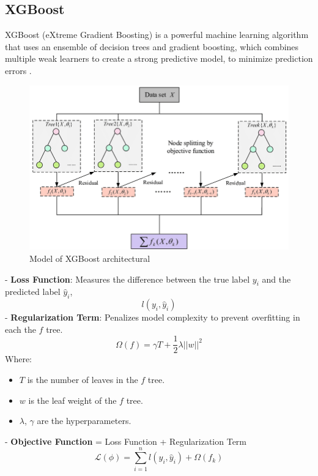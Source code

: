 \documentclass{ieeeojies}
\begin{document}
\subsection{XGBoost}
XGBoost (eXtreme Gradient Boosting) is a powerful machine learning algorithm that uses an ensemble of decision trees and gradient boosting, which combines multiple weak learners to create a strong predictive model, to minimize prediction errors \cite{b9}.\\
\begin{figure} [H]
    \centering
    \includegraphics[width=0.8\linewidth]{./image/XGBoost.png}
    \caption{Model of XGBoost architectural}
    \label{fig:10}
\end{figure}
\noindent
- \textbf{Loss Function}: Measures the difference between the true label \(y_i\) and the predicted label \(\hat{y}_i\),\\
\begin{dmath*}
    l(y_i, \hat{y}_i) 
\end{dmath*}
- \textbf{Regularization Term}: Penalizes model complexity to prevent overfitting in each the \(f\) tree.\\
\begin{dmath*}
    \Omega(f) = \gamma T + \frac{1}{2} \lambda ||w||^2
\end{dmath*}
Where:
\begin{itemize}
    \item \(T\) is the number of leaves in the \(f\) tree.
    \item \(w\) is the leaf weight of the \(f\) tree.
    \item \(\lambda\), \(\gamma\)  are the  hyperparameters.
\end{itemize}
- \textbf{Objective Function} = Loss Function + Regularization Term
\begin{dmath*}
    \mathcal{L}(\phi) = \sum_{i=1}^n l(y_i, \hat{y}_i) + \Omega(f_k)
\end{dmath*}
\end{document}
